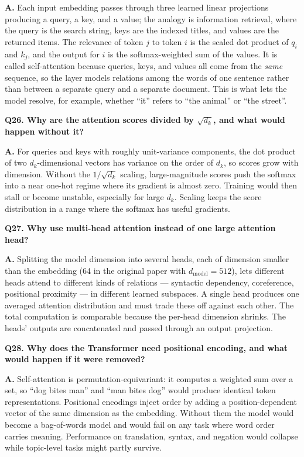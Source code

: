 \documentclass[11pt]{article}
\begin{document}
\noindent\textbf{A.} Each input embedding passes through three learned linear projections producing a query, a key, and a value; the analogy is information retrieval, where the query is the search string, keys are the indexed titles, and values are the returned items. The relevance of token $j$ to token $i$ is the scaled dot product of $q_i$ and $k_j$, and the output for $i$ is the softmax-weighted sum of the values. It is called self-attention because queries, keys, and values all come from the \emph{same} sequence, so the layer models relations among the words of one sentence rather than between a separate query and a separate document. This is what lets the model resolve, for example, whether ``it'' refers to ``the animal'' or ``the street''.

\medskip
\noindent\textbf{Q26. Why are the attention scores divided by $\sqrt{d_k}$, and what would happen without it?}

\noindent\textbf{A.} For queries and keys with roughly unit-variance components, the dot product of two $d_k$-dimensional vectors has variance on the order of $d_k$, so scores grow with dimension. Without the $1/\sqrt{d_k}$ scaling, large-magnitude scores push the softmax into a near one-hot regime where its gradient is almost zero. Training would then stall or become unstable, especially for large $d_k$. Scaling keeps the score distribution in a range where the softmax has useful gradients.

\medskip
\noindent\textbf{Q27. Why use multi-head attention instead of one large attention head?}

\noindent\textbf{A.} Splitting the model dimension into several heads, each of dimension smaller than the embedding (64 in the original paper with $d_{\text{model}}=512$), lets different heads attend to different kinds of relations --- syntactic dependency, coreference, positional proximity --- in different learned subspaces. A single head produces one averaged attention distribution and must trade these off against each other. The total computation is comparable because the per-head dimension shrinks. The heads' outputs are concatenated and passed through an output projection.

\medskip
\noindent\textbf{Q28. Why does the Transformer need positional encoding, and what would happen if it were removed?}

\noindent\textbf{A.} Self-attention is permutation-equivariant: it computes a weighted sum over a set, so ``dog bites man'' and ``man bites dog'' would produce identical token representations. Positional encodings inject order by adding a position-dependent vector of the same dimension as the embedding. Without them the model would become a bag-of-words model and would fail on any task where word order carries meaning. Performance on translation, syntax, and negation would collapse while topic-level tasks might partly survive.
\end{document}

